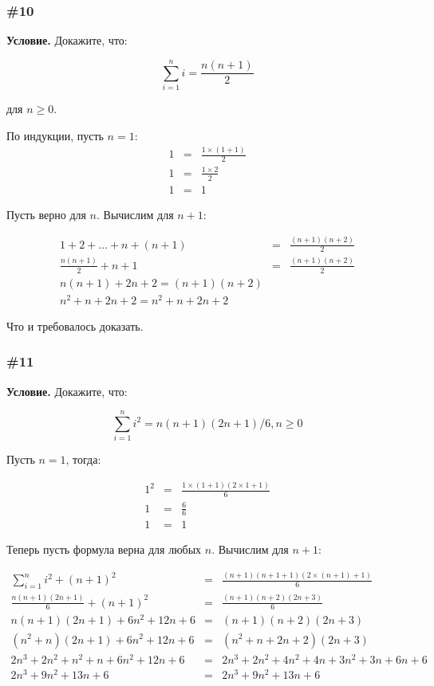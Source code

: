 \documentclass{article}
\begin{document}
\subsubsection{\#10}

\textbf{Условие.}
Докажите, что:

\begin{equation}
    \sum_{i=1}^ni=\frac{n(n+1)}{2}
\end{equation}

для \(n \geqslant 0\).

По индукции, пусть \(n=1\):
\begin{eqnarray}
    1 &=& \frac{1\times(1 + 1)}{2}\\
    1 &=& \frac{1 \times 2}{2}\\
    1 &=& 1
\end{eqnarray}

Пусть верно для \(n\).
Вычислим для \(n+1\):

\begin{eqnarray}
    1 + 2 + \ldots + n + (n + 1) &=& \frac{(n+1)(n+2)}{2}\\
    \frac{n(n+1)}{2} + n + 1 &=& \frac{(n+1)(n+2)}{2}\\
    n(n + 1) + 2n + 2 = (n + 1)(n + 2)\\
    n^2 + n + 2n + 2 = n^2 + n + 2n + 2
\end{eqnarray}

Что и требовалось доказать.

\subsubsection{\#11}

\textbf{Условие.}
Докажите, что:

\begin{equation}
    \sum_{i=1}^n i^2 = n(n+1)(2n+1)/6, n \geqslant 0
\end{equation}

Пусть \(n = 1\), тогда:

\begin{eqnarray}
    1^2 &=& \frac{1 \times (1 + 1)(2 \times 1 + 1)}{6}\\
    1 &=& \frac{6}{6} \\
    1 &=& 1
\end{eqnarray}

Теперь пусть формула верна для любых \(n\).
Вычислим для \(n+1\):

\begin{eqnarray}
    \sum_{i=1}^ni^2 + (n+1)^2 &=& \frac{(n+1)(n+1+1)(2 \times (n+1) + 1)}{6}\\
    \frac{n(n+1)(2n+1)}{6} + (n+1)^2 &=& \frac{(n+1)(n+2)(2n + 3)}{6}\\
    n(n+1)(2n+1) + 6n^2 + 12n + 6 &=& (n+1)(n+2)(2n+3)\\
    (n^2 + n)(2n+1) + 6n^2 + 12n + 6 &=& (n^2 + n + 2n + 2)(2n + 3)\\
    2n^3 + 2n^2 + n^2 + n + 6n^2 + 12n + 6 &=& 2n^3 + 2n^2 + 4n^2 + 4n + 3n^2 + 3n + 6n + 6\\
    2n^3 + 9n^2 + 13n + 6 &=& 2n^3 + 9n^2 + 13n + 6
\end{eqnarray}
\end{document}
